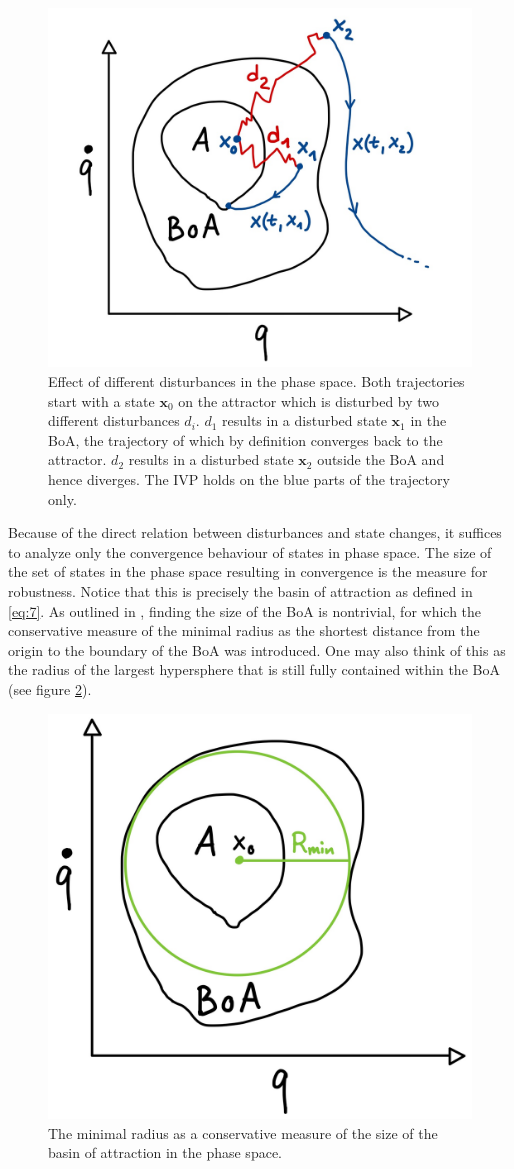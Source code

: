     \begin{figure}
    \centering
    \includegraphics[width=.5\textwidth]{figures/conv_div_viz_crop.png}
    \caption[Convergence and Divergence in the Phase Space]{Effect of different disturbances in the phase space. Both trajectories start with a state $\mathbf{x}_0$ on the attractor which is disturbed by two different disturbances $d_i$. $d_1$ results in a disturbed state $\mathbf{x}_1$ in the BoA, the trajectory of which by definition converges back to the attractor. $d_2$ results in a disturbed state $\mathbf{x}_2$ outside the BoA and hence diverges. The IVP holds on the blue parts of the trajectory only.}
    \label{convdiv}
    \end{figure}

    Because of the direct relation between disturbances and state changes, it suffices to analyze only the convergence behaviour of states in phase space. The size of the set of states in the phase space resulting in convergence is the measure for robustness. Notice that this is precisely the basin of attraction as defined in \ref{eq:7}. As outlined in \cite{quant}, finding the size of the BoA is nontrivial, for which the conservative measure of the minimal radius as the shortest distance from the origin to the boundary of the BoA was introduced. One may also think of this as the radius of the largest hypersphere that is still fully contained within the BoA (see figure \ref{minradboa}).

    \begin{figure}[h!]
    \centering
    \includegraphics[width=.4\textwidth]{figures/MinRad_col.png}
    \caption[Minimal Radius of Basin of attraction]{The minimal radius as a conservative measure of the size of the basin of attraction in the phase space.}
    \label{minradboa}
    \end{figure}

